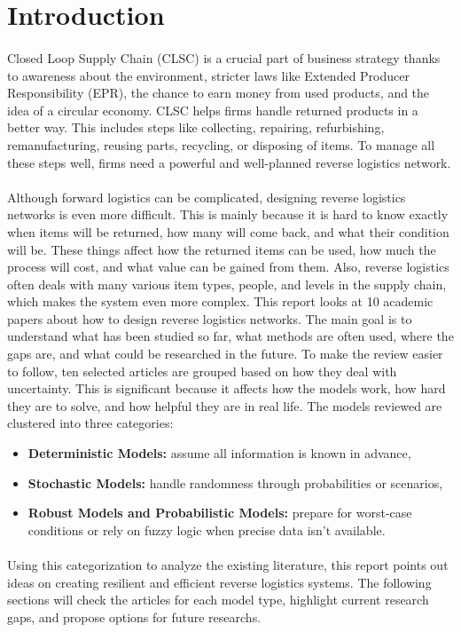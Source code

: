 \section{Introduction}

\paragraph{} Closed Loop Supply Chain (CLSC) is a crucial part of business strategy thanks to awareness about the environment, stricter laws like Extended Producer Responsibility (EPR), the chance to earn money from used products, and the idea of a circular economy. CLSC helps firms handle returned products in a better way. This includes steps like collecting, repairing, refurbishing, remanufacturing, reusing parts, recycling, or disposing of items. To manage all these steps well, firms need a powerful and well-planned reverse logistics network.

\paragraph{} Although forward logistics can be complicated, designing reverse logistics networks is even more difficult. This is mainly because it is hard to know exactly when items will be returned, how many will come back, and what their condition will be. These things affect how the returned items can be used, how much the process will cost, and what value can be gained from them. Also, reverse logistics often deals with many various item types, people, and levels in the supply chain, which makes the system even more complex.
This report looks at 10 academic papers about how to design reverse logistics networks. The main goal is to understand what has been studied so far, what methods are often used, where the gaps are, and what could be researched in the future. To make the review easier to follow, ten selected articles are grouped based on how they deal with uncertainty. This is significant because it affects how the models work, how hard they are to solve, and how helpful they are in real life.
The models reviewed are clustered into three categories:
\begin{itemize}[label=, leftmargin=2mm]
    \item \textbf{Deterministic Models:} assume all information is known in advance,
    \item \textbf{Stochastic Models:} handle randomness through probabilities or scenarios,
    \item \textbf{Robust Models and Probabilistic Models:} prepare for worst-case conditions or rely on fuzzy logic when precise data isn't available.
\end{itemize}

\paragraph{} Using this categorization to analyze the existing literature, this report points out ideas on creating resilient and efficient reverse logistics systems. The following sections will check the articles for each model type, highlight current research gaps, and propose options for future researchs.